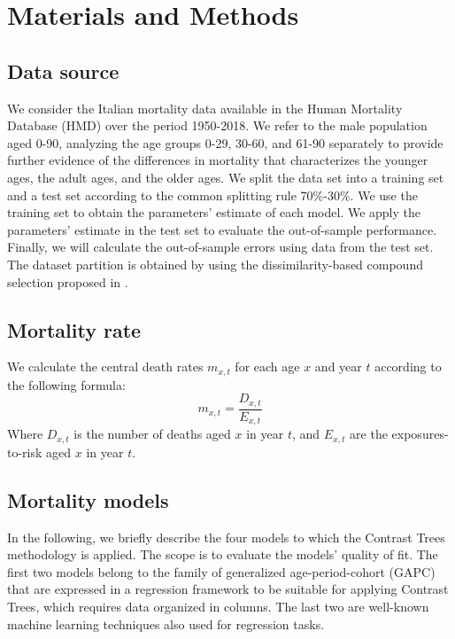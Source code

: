 \documentclass[fleqn,10pt]{wlscirep}
\begin{document}
\section*{Materials and Methods}

\subsection*{Data source}

We consider the Italian mortality data available in the Human Mortality Database (HMD) over the period 1950-2018. We refer to the male population aged \color{blue}0-90, analyzing the age groups 0-29, 30-60, and 61-90 separately to provide further evidence of the differences in mortality that characterizes the younger ages, the adult ages, and the older ages. 
We split the data set into a training set and a test set according to the common splitting rule 70\%-30\%. 
We use the training set to obtain the parameters' estimate of each model. We apply the parameters' estimate in the test set to evaluate the out-of-sample performance. Finally, we will calculate the out-of-sample errors using data from the test set.
\color{black}
The dataset partition is obtained by using the dissimilarity-based compound selection proposed in \cite{Willett1999}.

\subsection*{Mortality rate}
We calculate the central death rates $m_{x,t}$ for each age $x$ and year $t$ according to the following formula:
\begin{equation} 
\label{eq:mxt}
m_{x,t}=\frac{D_{x,t}}{E_{x,t}}
\end{equation}
Where $D_{x,t}$ is the number of deaths aged $x$ in year $t$, and $E_{x,t}$ are the exposures-to-risk aged $x$ in year $t$.

\subsection*{Mortality models}
\color{blue}In the following, we briefly describe the four models to which the Contrast Trees methodology is applied. The scope is to evaluate the models' quality of fit. \color{black}
The first two models belong to the family of generalized age-period-cohort (GAPC) that are expressed in a regression framework to be suitable for applying Contrast Trees, which requires data organized in columns. The last two are well-known machine learning techniques also used for regression tasks.\\
\end{document}
